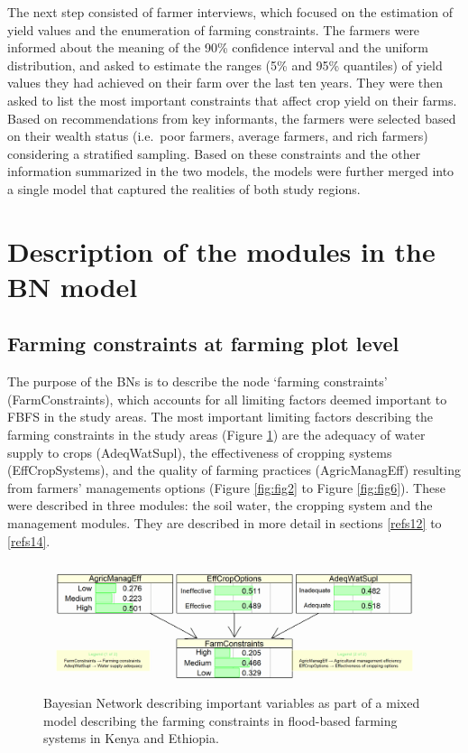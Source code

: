 \documentclass[]{elsarticle} %
\begin{document}
The next step consisted of farmer interviews, which focused on the estimation of yield values and the enumeration of farming constraints. The farmers were informed about the meaning of the 90\% confidence interval and the uniform distribution, and asked to estimate the ranges (5\% and 95\% quantiles) of yield values they had achieved on their farm over the last ten years. They were then asked to list the most important constraints that affect crop yield on their farms. Based on recommendations from key informants, the farmers were selected based on their wealth status (i.e.~poor farmers, average farmers, and rich farmers) considering a stratified sampling. Based on these constraints and the other information summarized in the two models, the models were further merged into a single model that captured the realities of both study regions.

\hypertarget{refs1}{%
\section{Description of the modules in the BN model}\label{refs1}}

\hypertarget{refs11}{%
\subsection{Farming constraints at farming plot level}\label{refs11}}

The purpose of the BNs is to describe the node `farming constraints' (FarmConstraints), which accounts for all limiting factors deemed important to FBFS in the study areas. The most important limiting factors describing the farming constraints in the study areas (Figure \ref{fig:fig1}) are the adequacy of water supply to crops (AdeqWatSupl), the effectiveness of cropping systems (EffCropSystems), and the quality of farming practices (AgricManagEff) resulting from farmers' managements options (Figure \ref{fig:fig2} to Figure \ref{fig:fig6}). These were described in three modules: the soil water, the cropping system and the management modules. They are described in more detail in sections \ref{refs12} to \ref{refs14}.

\begin{figure}[!h]

{\centering \includegraphics[width=1\linewidth,]{figures/figure_s1} 

}

\caption{Bayesian Network describing important variables as part of a mixed model describing the farming constraints in flood-based farming systems in Kenya and Ethiopia.}\label{fig:fig1}
\end{figure}
\end{document}
